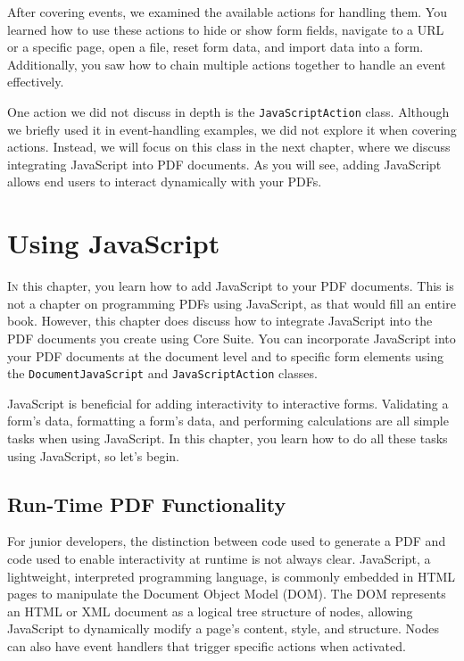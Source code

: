 \documentclass[american,letterpaper]{tufte-book}
\numberwithin{equation}{section}
\numberwithin{figure}{section}
\def\color#1{}%
\begin{document}
{{After covering events, we examined the available actions for handling them. You learned how to use these actions to hide or show form fields, navigate to a URL or a specific page, open a file, reset form data, and import data into a form. Additionally, you saw how to chain multiple actions together to handle an event effectively.

One action we did not discuss in depth is the \texttt{JavaScriptAction} class. Although we briefly used it in event-handling examples, we did not explore it when covering actions. Instead, we will focus on this class in the next chapter, where we discuss integrating JavaScript into PDF documents. As you will see, adding JavaScript allows end users to interact dynamically with your PDFs.

\color{white}
\chapter{Using JavaScript}\label{chap:Using-JavaScript}
\color{black}
\BgThispage
\vspace{8.00em}
\lettrine[lines=2,lhang=0.1]{I}{n} this chapter, you learn how to add JavaScript to your PDF documents.
This is not a chapter on programming PDFs using JavaScript, as that
would fill an entire book. However, this chapter does discuss how
to integrate JavaScript into the PDF documents you create using Core
Suite. You can incorporate JavaScript into your PDF documents at the
document level and to specific form elements using the \texttt{DocumentJavaScript}
and \texttt{JavaScriptAction} classes.

JavaScript is beneficial for adding interactivity to interactive
forms. Validating a form's data, formatting a form's data, and performing
calculations are all simple tasks when using JavaScript. In this chapter,
you learn how to do all these tasks using JavaScript, so let's
begin.

\section{Run-Time PDF Functionality}

For junior developers, the distinction between code used to generate a PDF and code used to enable interactivity at runtime is not always clear. JavaScript, a lightweight, interpreted programming language, is commonly embedded in HTML pages to manipulate the Document Object Model (DOM). The DOM represents an HTML or XML document as a logical tree structure of nodes, allowing JavaScript to dynamically modify a page’s content, style, and structure. Nodes can also have event handlers that trigger specific actions when activated.

}}
\end{document}
